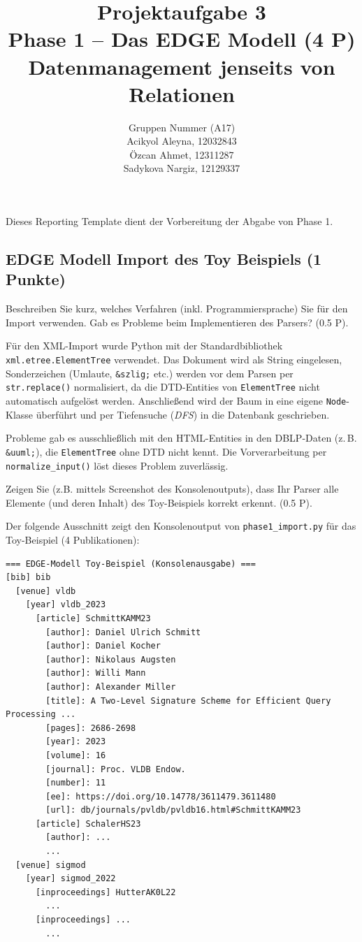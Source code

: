 \documentclass[11pt]{scrartcl}
\title{
  \textbf{\large Projektaufgabe 3 } \\
  Phase 1 – Das EDGE Modell (4 P) \\
  {\large Datenmanagement jenseits von Relationen}
}
\author{
  Gruppen Nummer (A17) \\
  \large Acikyol Aleyna, 12032843 \\
  \large Özcan Ahmet, 12311287 \\
  \large Sadykova Nargiz, 12129337
}
\begin{document}
\maketitle\thispagestyle{empty}

Dieses Reporting Template dient der Vorbereitung der Abgabe von Phase 1.

\subsection*{EDGE Modell Import des Toy Beispiels (1 Punkte)}

Beschreiben Sie kurz, welches Verfahren (inkl. Programmiersprache) Sie für den Import verwenden. Gab es Probleme beim Implementieren des Parsers? (0.5 P).

Für den XML-Import wurde Python mit der Standardbibliothek \texttt{xml.etree.ElementTree} verwendet.
Das Dokument wird als String eingelesen, Sonderzeichen (Umlaute, \texttt{\&szlig;} etc.) werden vor dem
Parsen per \texttt{str.replace()} normalisiert, da die DTD-Entities von \texttt{ElementTree} nicht
automatisch aufgelöst werden. Anschließend wird der Baum in eine eigene \texttt{Node}-Klasse überführt
und per Tiefensuche (\emph{DFS}) in die Datenbank geschrieben.

Probleme gab es ausschließlich mit den HTML-Entities in den DBLP-Daten (z.\,B. \texttt{\&uuml;}),
die \texttt{ElementTree} ohne DTD nicht kennt. Die Vorverarbeitung per \texttt{normalize\_input()}
löst dieses Problem zuverlässig.

Zeigen Sie (z.B. mittels Screenshot des Konsolenoutputs), dass Ihr Parser alle Elemente (und deren Inhalt) des Toy-Beispiels korrekt erkennt. (0.5 P).

Der folgende Ausschnitt zeigt den Konsolenoutput von \texttt{phase1\_import.py} für das Toy-Beispiel
(4 Publikationen):

\begin{lstlisting}[style=dmrPython, frame=single]
=== EDGE-Modell Toy-Beispiel (Konsolenausgabe) ===
[bib] bib
  [venue] vldb
    [year] vldb_2023
      [article] SchmittKAMM23
        [author]: Daniel Ulrich Schmitt
        [author]: Daniel Kocher
        [author]: Nikolaus Augsten
        [author]: Willi Mann
        [author]: Alexander Miller
        [title]: A Two-Level Signature Scheme for Efficient Query Processing ...
        [pages]: 2686-2698
        [year]: 2023
        [volume]: 16
        [journal]: Proc. VLDB Endow.
        [number]: 11
        [ee]: https://doi.org/10.14778/3611479.3611480
        [url]: db/journals/pvldb/pvldb16.html#SchmittKAMM23
      [article] SchalerHS23
        [author]: ...
        ...
  [venue] sigmod
    [year] sigmod_2022
      [inproceedings] HutterAK0L22
        ...
      [inproceedings] ...
        ...
\end{lstlisting}
\end{document}
